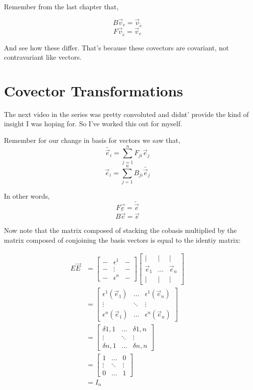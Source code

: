 \documentclass[12pt]{book}
\theoremstyle{plain}
\theoremstyle{definition}
\theoremstyle{ppart}
\theoremstyle{case}
\theoremstyle{solution}
\begin{document}
Remember from the last chapter that,

\[ B \vec{v}_{e} = \vec{v}_{\widetilde{e}} \]
\[ F \vec{v}_{\widetilde{e}} = \vec{v}_{e} \]

And see how these differ. That's because these covectors are covariant, not contravariant like vectors.

\section{Covector Transformations}

The next video in the series was pretty convoluted and didnt' provide the kind of insight I was hoping for.
So I've worked this out for myself.

Remember for our change in basis for vectors we saw that,
\[ \widetilde{\vec{e}_i} = \sum_{j=1}^{n} F_{ji} \vec{e}_j \]
\[ \vec{e}_i = \sum_{j=1}^{n} B_{ji} \widetilde{\vec{e}_j} \]

In other words, 
\[ F \vec{e} = \widetilde{\vec{e}} \]
\[ B \widetilde{\vec{e}} = \vec{e} \]

Now note that the matrix composed of stacking the cobasis multiplied by the matrix composed of conjoining the basis vectors
is equal to the identiy matrix:

\begin{align*}
  E \vec{E} &=
  \begin{bmatrix}
  - & \epsilon^1 & - \\
  - & \vdots & - \\
  - & \epsilon^n & -
  \end{bmatrix}
  \begin{bmatrix}
  | & | & | \\
  \vec{e}_1 & \dots  & \vec{e}_n \\
  | & | & |
  \end{bmatrix} \\
  &= 
  \begin{bmatrix}
  \epsilon^1(\vec{e}_1) & \dots & \epsilon^1(\vec{e}_n) \\
  \vdots & \ddots & \vdots \\
  \epsilon^n(\vec{e}_1) & \dots & \epsilon^n(\vec{e}_n)
  \end{bmatrix} \\
  &= 
  \begin{bmatrix}
  \delta{1,1} & \dots & \delta{1,n} \\
  \vdots & \ddots & \vdots \\
  \delta{n,1} & \dots & \delta{n,n}
  \end{bmatrix} \\
  &= 
  \begin{bmatrix}
  1 & \dots & 0 \\
  \vdots & \ddots & \vdots \\
  0 & \dots & 1 
  \end{bmatrix} \\
  &= I_n
\end{align*}
\end{document}
